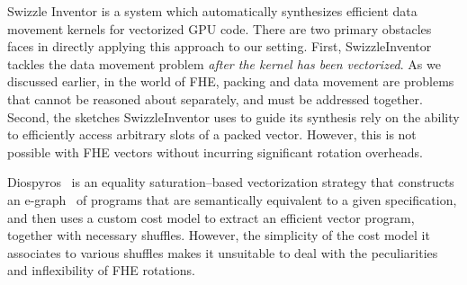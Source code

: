 Swizzle Inventor \cite{SwizzleInventor} is a system which automatically synthesizes efficient data movement kernels for vectorized GPU code.
There are two primary obstacles \system faces in directly applying this approach to our setting.
First, SwizzleInventor tackles the data movement problem {\em after the kernel has been vectorized}. As we discussed earlier, in the world of FHE, packing and data movement are problems that cannot be reasoned about separately, and must be addressed together.
Second, the sketches SwizzleInventor uses to guide its synthesis rely on the ability to efficiently access arbitrary slots of a packed vector. However, this is not possible with FHE vectors without incurring significant rotation overheads.

Diospyros~\cite{Diospyros} is an equality saturation--based vectorization strategy that constructs an e-graph~\cite{EqualitySaturation, egg} of programs that are semantically equivalent to a given specification, and then uses a custom cost model to extract an efficient vector program, together with necessary shuffles.
However, the simplicity of the cost model it associates to various shuffles makes it unsuitable to deal with the peculiarities and inflexibility of FHE rotations.


